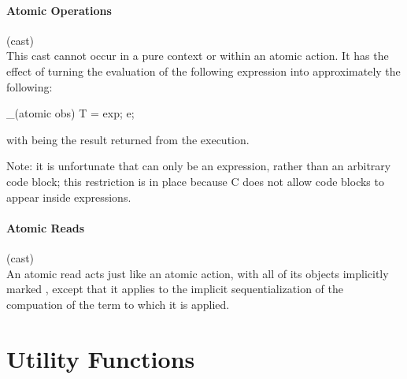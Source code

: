\documentclass[preprint,nocopyrightspace]{sigplanconf}
\newcommand{\subsubsubsection}[1]{\paragraph{#1}}
\begin{document}
{{{\subsubsubsection{Atomic Operations}

\noindent{} (cast)\\
This cast cannot occur in a pure context or within an atomic action.
It has the effect of turning the evaluation of the following
expression  into approximately the following:
\begin{VCC}
_(atomic obs) {
  T \result = exp;
  e;
}
\end{VCC}
with \vcc{\result} being the result returned from the execution. 

Note: it is unfortunate that  can only be an expression, rather
than an arbitrary code block; this restriction is in place because C
does not allow code blocks to appear inside expressions. 

\subsubsubsection{Atomic Reads}

 (cast)\\
An atomic read acts just like an atomic action, with all of its
objects implicitly marked , except that it applies
to the implicit sequentialization of the compuation of the term to
which it is applied.

\section{Utility Functions}



}}}
\end{document}
